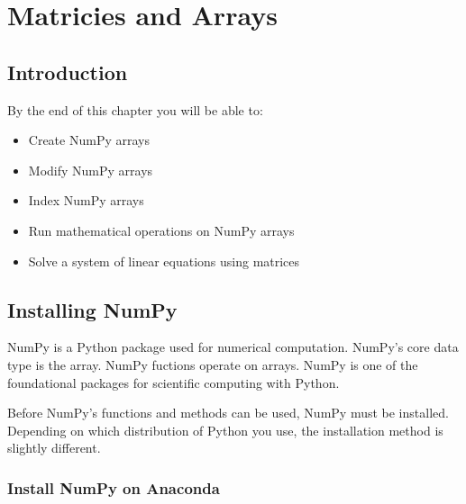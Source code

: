 \documentclass{book}
\begin{document}
    
        \chapter{Matricies and Arrays}\label{matricies-and-arrays}
    




    
        \section{Introduction}\label{introduction}
    




    
        By the end of this chapter you will be able to:

\begin{itemize}
\item
  Create NumPy arrays
\item
  Modify NumPy arrays
\item
  Index NumPy arrays
\item
  Run mathematical operations on NumPy arrays
\item
  Solve a system of linear equations using matrices
\end{itemize}
        \newpage



    




    
        \section{Installing NumPy}\label{installing-numpy}
    




    
        NumPy is a Python package used for numerical computation. NumPy's core
data type is the array. NumPy fuctions operate on arrays. NumPy is one
of the foundational packages for scientific computing with Python.

Before NumPy's functions and methods can be used, NumPy must be
installed. Depending on which distribution of Python you use, the
installation method is slightly different.
    




    
        \subsection{Install NumPy on Anaconda}\label{install-numpy-on-anaconda}
\end{document}
